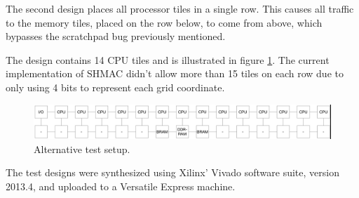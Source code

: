 The second design places all processor tiles in a single row. This causes all traffic
to the memory tiles, placed on the row below, to come from above, which bypasses the
scratchpad bug previously mentioned.

The design contains 14 CPU tiles and is illustrated in figure \ref{fig:15x2}. The
current implementation of SHMAC didn't allow more than 15 tiles on each row due
to only using 4 bits to represent each grid coordinate.

\begin{figure}[htb]
    \centering
    \includegraphics[width=1.0\textwidth]{Figures/Measurements/15x2}
    \caption{Alternative test setup.}
    \label{fig:15x2}
\end{figure}

The test designs were synthesized using Xilinx' Vivado software suite, version 2013.4, and
uploaded to a Versatile Express machine.


